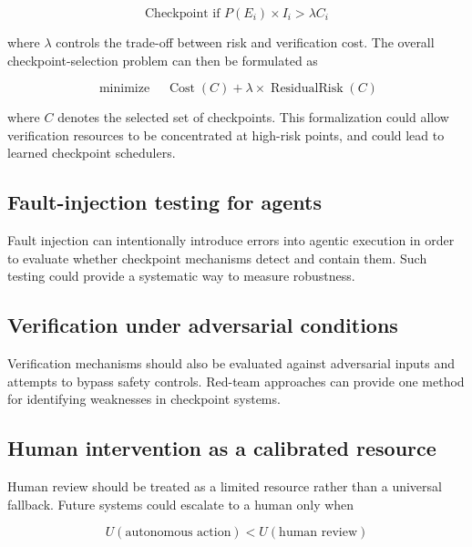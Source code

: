 \documentclass[12pt]{article}
\begin{document}
\begin{equation}
\text{Checkpoint if }
P(E_i)\times I_i>\lambda C_i
\label{eq:checkpoint-rule}
\end{equation}

where $\lambda$ controls the trade-off between risk and verification cost.
The overall checkpoint-selection problem can then be formulated as

\begin{equation}
\operatorname{minimize}\quad
\operatorname{Cost}(C)
+
\lambda\times\operatorname{ResidualRisk}(C)
\label{eq:checkpoint-optimization}
\end{equation}

where $C$ denotes the selected set of checkpoints. This formalization could
allow verification resources to be concentrated at high-risk points, and
could lead to learned checkpoint schedulers.

\subsection{Fault-injection testing for agents}
\label{sec:fault-injection}

Fault injection can intentionally introduce errors into agentic execution in
order to evaluate whether checkpoint mechanisms detect and contain them. Such
testing could provide a systematic way to measure robustness.

\subsection{Verification under adversarial conditions}
\label{sec:adversarial-verification}

Verification mechanisms should also be evaluated against adversarial inputs and
attempts to bypass safety controls. Red-team approaches can provide one method
for identifying weaknesses in checkpoint systems.

\subsection{Human intervention as a calibrated resource}
\label{sec:human-intervention}

Human review should be treated as a limited resource rather than a universal
fallback. Future systems could escalate to a human only when

\begin{equation}
U(\text{autonomous action})
<
U(\text{human review})
\label{eq:human-review}
\end{equation}
\end{document}
